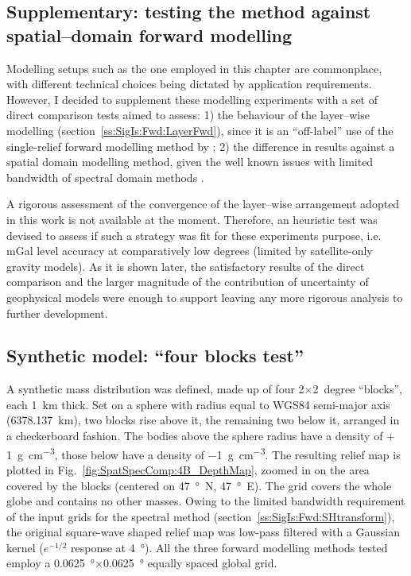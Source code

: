 \begin{subappendices}
\section[Supplementary:~testing the method against spatial--domain forward modelling]{Supplementary: testing the method against spatial--domain forward modelling}
\label{s:SigIs:Test}

Modelling setups such as the one employed in this chapter are commonplace, with different technical choices being dictated by application requirements.
However, I decided to supplement these modelling experiments with a set of direct comparison tests aimed to assess:
1) the behaviour of the layer--wise modelling (section~\ref{ss:SigIs:Fwd:LayerFwd}), since it is an ``off-label'' use of the single-relief forward modelling method by \textcite{Wieczorek2007};
2) the difference in results against a spatial domain modelling method, given the well known issues with limited bandwidth of spectral domain methods \parencite{Hirt2014}.

A rigorous assessment of the convergence of the layer--wise arrangement adopted in this work is not available at the moment.
Therefore, an heuristic test was devised to assess if such a strategy was fit for these experiments purpose, i.e. \si{\milli Gal} level accuracy at comparatively low degrees (limited by satellite-only gravity models).
As it is shown later, the satisfactory results of the direct comparison and the larger magnitude of the contribution of uncertainty of geophysical models were enough to support leaving any more rigorous analysis to further development.

\subsection{Synthetic model: ``four blocks test''}
\label{ss:SigIs:Test:FourBlocks}

A synthetic mass distribution was defined, made up of four 2$\times$2~degree ``blocks'', each \SI{1}{\kilo \metre} thick.
Set on a sphere with radius equal to WGS84 semi-major axis (\SI{6378.137}{\kilo \metre}), two blocks rise above it, the remaining two below it, arranged in a checkerboard fashion.
The bodies above the sphere radius have a density of $+$\SI{1}{\gram \per \cubic \centi \metre}, those below have a density of \SI{-1}{\gram \per \cubic \centi \metre}.
The resulting relief map is plotted in Fig.~\ref{fig:SpatSpecComp:4B_DepthMap}, zoomed in on the area covered by the blocks (centered on \SI{47}{\degree N}, \SI{47}{\degree E}).
The grid covers the whole globe and contains no other masses.
Owing to the limited bandwidth requirement of the input grids for the spectral method (section~\ref{ss:SigIs:Fwd:SHtransform}), the original square-wave shaped relief map was low-pass filtered with a Gaussian kernel ($e^{-1/2}$ response at \SI{4}{\degree}).
All the three forward modelling methods tested employ a \SI{0.0625}{\degree}$\times$\SI{0.0625}{\degree} equally spaced global grid.


\end{subappendices}
